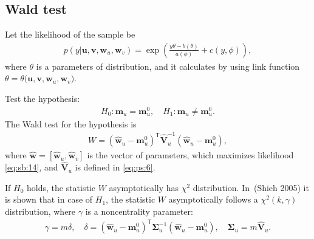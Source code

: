 \documentclass[
11pt,%
tightenlines,%
twoside,%
onecolumn,%
nofloats,%
nobibnotes,%
nofootinbib,%
superscriptaddress,%
noshowpacs,%
centertags]%
{revtex4}
\begin{document}
\subsection{Wald test}
Let the likelihood of the sample be
\begin{equation}
\label{eq:sb:14}
\begin{aligned}
	p(y|\textbf{u},\textbf{v},\textbf{w}_{u},\textbf{w}_{v}) = \exp\left(\frac{y\theta- b(\theta)}{a(\phi)} + c\left(y, \phi\right)\right),
\end{aligned}
\end{equation}
where $\theta$ is a parameters of distribution, and it calculates by using link function $\theta=\theta\bigr(\textbf{u},\textbf{v},\textbf{w}_{u},\textbf{w}_{v}\bigr)$.

Test the hypothesis:
\begin{equation}
\label{eq:sb:15}
\begin{aligned}
	H_0: \textbf{m}_{u} = \textbf{m}_{u}^{0}, \quad H_1: \textbf{m}_{u} \not=\textbf{m}_{u}^{0}.
\end{aligned}
\end{equation}
The Wald test for the hypothesis is
\begin{equation}
\label{eq:sb:16}
\begin{aligned}
	W = \left(\hat{\textbf{w}}_{u} - \textbf{m}_{u}^{0}\right)^{\mathsf{T}}\hat{\textbf{V}}_{u}^{-1}\left(\hat{\textbf{w}}_{u} - \textbf{m}_{u}^{0}\right),
\end{aligned}
\end{equation}
where $\hat{\textbf{w}} = [\hat{\textbf{w}}_{u},\hat{\textbf{w}}_{v}]$ is the vector of parameters, which maximizes likelihood \eqref{eq:sb:14}, and $\hat{\textbf{V}}_u$ is defined in \eqref{eq:ps:6}.

If $H_0$ holds, the statistic $W$ asymptotically has $\chi^2$ distribution. In~(Shieh 2005) it is shown that in case of $H_1$, the statistic $W$ asymptotically follows a $\chi^2(k,\gamma)$ distribution, where $\gamma$ is a noncentrality parameter:
\begin{equation}
\label{eq:sb:17}
\begin{aligned}
	\gamma = m\delta, \quad \delta = \left(\hat{\textbf{w}}_{u} - \textbf{m}_{u}^{0}\right)^{\mathsf{T}}\bm{\Sigma}^{-1}_u\left(\hat{\textbf{w}}_{u} - \textbf{m}_{u}^{0}\right), \quad \bm{\Sigma}_u = m\hat{\textbf{V}}_u.
\end{aligned}
\end{equation}
\end{document}
